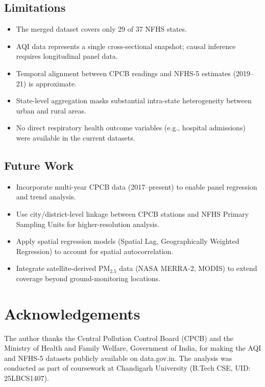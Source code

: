 \documentclass[10pt, conference]{IEEEtran}
\begin{document}
\subsection{Limitations}

\begin{itemize}[leftmargin=*]
  \item The merged dataset covers only 29 of 37 NFHS states.
  \item AQI data represents a single cross-sectional snapshot;
        causal inference requires longitudinal panel data.
  \item Temporal alignment between CPCB readings and NFHS-5
        estimates (2019--21) is approximate.
  \item State-level aggregation masks substantial intra-state
        heterogeneity between urban and rural areas.
  \item No direct respiratory health outcome variables
        (e.g., hospital admissions) were available in the
        current datasets.
\end{itemize}

\subsection{Future Work}

\begin{itemize}[leftmargin=*]
  \item Incorporate multi-year CPCB data (2017--present) to
        enable panel regression and trend analysis.
  \item Use city/district-level linkage between CPCB stations
        and NFHS Primary Sampling Units for higher-resolution
        analysis.
  \item Apply spatial regression models (Spatial Lag,
        Geographically Weighted Regression) to account for
        spatial autocorrelation.
  \item Integrate satellite-derived PM$_{2.5}$ data
        (NASA MERRA-2, MODIS) to extend coverage beyond
        ground-monitoring locations.
\end{itemize}

\section*{Acknowledgements}
The author thanks the Central Pollution Control Board (CPCB)
and the Ministry of Health and Family Welfare, Government of
India, for making the AQI and NFHS-5 datasets publicly
available on data.gov.in.
The analysis was conducted as part of coursework at
Chandigarh University (B.Tech CSE, UID: 25LBCS1407).
\end{document}
